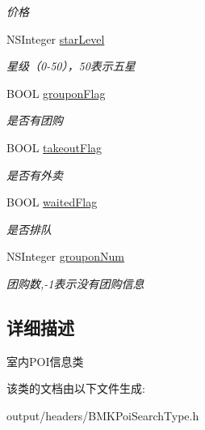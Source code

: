 \begin{DoxyCompactItemize}
\begin{DoxyCompactList}\small\item\em 价格 \end{DoxyCompactList}\item 
\hypertarget{interface_b_m_k_poi_indoor_info_a91861a3a850628c194b5d13b2b98505f}{}N\+S\+Integer \hyperlink{interface_b_m_k_poi_indoor_info_a91861a3a850628c194b5d13b2b98505f}{star\+Level}\label{interface_b_m_k_poi_indoor_info_a91861a3a850628c194b5d13b2b98505f}

\begin{DoxyCompactList}\small\item\em 星级（0-\/50），50表示五星 \end{DoxyCompactList}\item 
\hypertarget{interface_b_m_k_poi_indoor_info_a818d803ed35f4f2f4100f49901a5f2c7}{}B\+O\+O\+L \hyperlink{interface_b_m_k_poi_indoor_info_a818d803ed35f4f2f4100f49901a5f2c7}{groupon\+Flag}\label{interface_b_m_k_poi_indoor_info_a818d803ed35f4f2f4100f49901a5f2c7}

\begin{DoxyCompactList}\small\item\em 是否有团购 \end{DoxyCompactList}\item 
\hypertarget{interface_b_m_k_poi_indoor_info_aae842ef033ff6f18ba9f4da7c917f661}{}B\+O\+O\+L \hyperlink{interface_b_m_k_poi_indoor_info_aae842ef033ff6f18ba9f4da7c917f661}{takeout\+Flag}\label{interface_b_m_k_poi_indoor_info_aae842ef033ff6f18ba9f4da7c917f661}

\begin{DoxyCompactList}\small\item\em 是否有外卖 \end{DoxyCompactList}\item 
\hypertarget{interface_b_m_k_poi_indoor_info_a14da8ef1b9f1860d8d1c68f3863bfca6}{}B\+O\+O\+L \hyperlink{interface_b_m_k_poi_indoor_info_a14da8ef1b9f1860d8d1c68f3863bfca6}{waited\+Flag}\label{interface_b_m_k_poi_indoor_info_a14da8ef1b9f1860d8d1c68f3863bfca6}

\begin{DoxyCompactList}\small\item\em 是否排队 \end{DoxyCompactList}\item 
\hypertarget{interface_b_m_k_poi_indoor_info_a0ebd84f1a79cb56377bd48498d87faab}{}N\+S\+Integer \hyperlink{interface_b_m_k_poi_indoor_info_a0ebd84f1a79cb56377bd48498d87faab}{groupon\+Num}\label{interface_b_m_k_poi_indoor_info_a0ebd84f1a79cb56377bd48498d87faab}

\begin{DoxyCompactList}\small\item\em 团购数,-\/1表示没有团购信息 \end{DoxyCompactList}\end{DoxyCompactItemize}


\subsection{详细描述}
室内\+P\+O\+I信息类 

该类的文档由以下文件生成\+:\begin{DoxyCompactItemize}
\item 
output/headers/B\+M\+K\+Poi\+Search\+Type.\+h\end{DoxyCompactItemize}
